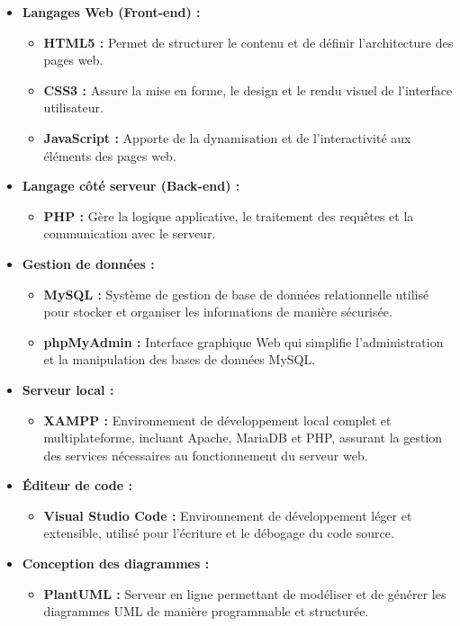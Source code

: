 \begin{itemize}[label=$\bullet$]
   \item \textbf{Langages Web (Front-end) :}
   \begin{itemize}[label=$\circ$]
     \item \textbf{HTML5 :} Permet de structurer le contenu et de définir l'architecture des pages web.
     \item \textbf{CSS3 :} Assure la mise en forme, le design et le rendu visuel de l'interface utilisateur.
     \item \textbf{JavaScript :} Apporte de la dynamisation et de l'interactivité aux éléments des pages web.
   \end{itemize}
   
   \item \textbf{Langage côté serveur (Back-end) :}
   \begin{itemize}[label=$\circ$]
     \item \textbf{PHP :} Gère la logique applicative, le traitement des requêtes et la communication avec le serveur.
   \end{itemize}
   
   \item \textbf{Gestion de données :}
   \begin{itemize}[label=$\circ$]
     \item \textbf{MySQL :} Système de gestion de base de données relationnelle utilisé pour stocker et organiser les informations de manière sécurisée.
     \item \textbf{phpMyAdmin :} Interface graphique Web qui simplifie l'administration et la manipulation des bases de données MySQL.
   \end{itemize}
   
   \item \textbf{Serveur local :}
   \begin{itemize}[label=$\circ$]
     \item \textbf{XAMPP :} Environnement de développement local complet et multiplateforme, incluant Apache, MariaDB et PHP, assurant la gestion des services nécessaires au fonctionnement du serveur web.
   \end{itemize}
   
   \item \textbf{Éditeur de code :}
   \begin{itemize}[label=$\circ$]
     \item \textbf{Visual Studio Code :} Environnement de développement léger et extensible, utilisé pour l'écriture et le débogage du code source.
   \end{itemize}
   
   \item \textbf{Conception des diagrammes :}
   \begin{itemize}[label=$\circ$]
     \item \textbf{PlantUML :} Serveur en ligne permettant de modéliser et de générer les diagrammes UML de manière programmable et structurée.
   \end{itemize}
\end{itemize}